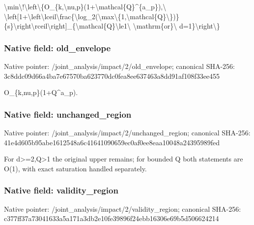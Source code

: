 \documentclass[10pt,a4paper]{article}
\begin{document}
\begingroup\raggedright\sloppy \textbackslash{}min\textbackslash{}!\textbackslash{}left\textbackslash{}\{O\_\allowbreak{}\{k,\allowbreak{}\textbackslash{}nu,\allowbreak{}p\}(1+\textbackslash{}mathcal\{Q\}\textasciicircum{}\{a\_\allowbreak{}p\}),\allowbreak{}\textbackslash{} \textbackslash{}left[1+\textbackslash{}left\textbackslash{}lceil\textbackslash{}frac\{\textbackslash{}log\_\allowbreak{}2(\textbackslash{}max\textbackslash{}\{1,\allowbreak{}\textbackslash{}mathcal\{Q\}\textbackslash{}\})\}\{s\}\textbackslash{}right\textbackslash{}rceil\textbackslash{}right]\_\allowbreak{}\{\textbackslash{}mathcal\{Q\}\textbackslash{}le1\textbackslash{} \textbackslash{}mathrm\{or\}\textbackslash{} d=\allowbreak{}1\}\textbackslash{}right\textbackslash{}\}\par\endgroup

\subsubsection{Native field: old\_\allowbreak{}envelope}
Native pointer: /joint\_\allowbreak{}analysis/impact/2/old\_\allowbreak{}envelope; canonical SHA-256: 3c8ddc09d66a4ba7e67570ba623770dc0fea8ee637463a8dd91af108f33ee455

\begingroup\raggedright\sloppy O\_\allowbreak{}\{k,\allowbreak{}nu,\allowbreak{}p\}(1+Q\textasciicircum{}a\_\allowbreak{}p).\par\endgroup

\subsubsection{Native field: unchanged\_\allowbreak{}region}
Native pointer: /joint\_\allowbreak{}analysis/impact/2/unchanged\_\allowbreak{}region; canonical SHA-256: 41e4d605b95abe1612548a6c41641090659ec0af0ee8eaa10048a24395989fed

\begingroup\raggedright\sloppy For d>=\allowbreak{}2,\allowbreak{}Q>1 the original upper remains;\allowbreak{} for bounded Q both statements are O(1),\allowbreak{} with exact saturation handled separately.\par\endgroup

\subsubsection{Native field: validity\_\allowbreak{}region}
Native pointer: /joint\_\allowbreak{}analysis/impact/2/validity\_\allowbreak{}region; canonical SHA-256: c377ff37a73041633a5a171a3db2e10fe39896f24ebb16306e69b5d506624214
\end{document}
